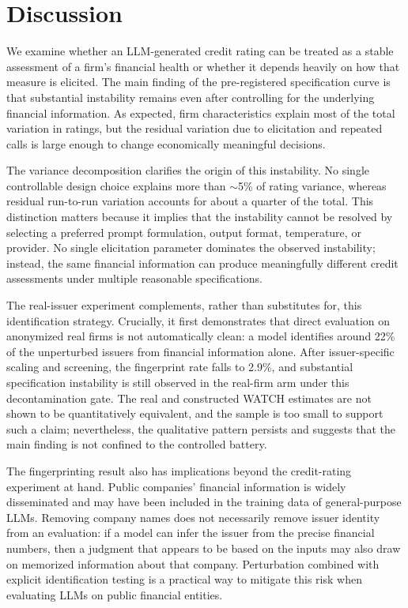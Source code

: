 \documentclass[pdflatex,sn-nature,lineno]{sn-jnl}
\theoremstyle{thmstyleone}
\begin{document}
\section{Discussion}
We examine whether an LLM-generated credit rating can be treated as a stable assessment of a firm's
financial health or whether it depends heavily on how that measure is elicited. The main finding of the
pre-registered specification curve is that substantial instability remains even after controlling for the
underlying financial information. As expected, firm characteristics explain most of the total variation
in ratings, but the residual variation due to elicitation and repeated calls is large enough to change
economically meaningful decisions.

The variance decomposition clarifies the origin of this instability. No single controllable design choice
explains more than $\sim$5\% of rating variance, whereas residual run-to-run variation accounts for about
a quarter of the total. This distinction matters because it implies that the instability cannot be
resolved by selecting a preferred prompt formulation, output format, temperature, or provider. No single
elicitation parameter dominates the observed instability; instead, the same financial
information can produce meaningfully different credit assessments under multiple reasonable
specifications.

The real-issuer experiment complements, rather than substitutes for, this identification strategy.
Crucially, it first demonstrates that direct evaluation on anonymized real firms is not automatically
clean: a model identifies around 22\% of the unperturbed issuers from financial information alone. After
issuer-specific scaling and screening, the fingerprint rate falls to 2.9\%, and substantial
specification instability is still observed in the real-firm arm under this decontamination gate. The
real and constructed WATCH estimates are not shown to be quantitatively equivalent, and the sample is too
small to support such a claim; nevertheless, the qualitative pattern persists and suggests that the main
finding is not confined to the controlled battery.

The fingerprinting result also has implications beyond the credit-rating experiment at hand. Public
companies' financial information is widely disseminated and may have been included in the training data
of general-purpose LLMs. Removing company names does not necessarily remove issuer identity from an
evaluation: if a model can infer the issuer from the precise financial numbers, then a judgment that
appears to be based on the inputs may also draw on memorized information about that company. Perturbation
combined with explicit identification testing is a practical way to mitigate this risk when evaluating
LLMs on public financial entities.
\end{document}

